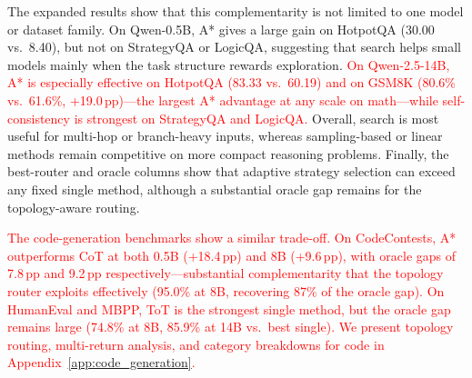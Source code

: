 \documentclass[10pt]{article}
\begin{document}
The expanded results show that this complementarity is not limited to one model or dataset family. On Qwen-0.5B, A* gives a large gain on HotpotQA (30.00 vs.\ 8.40), but not on StrategyQA or LogicQA, suggesting that search helps small models mainly when the task structure rewards exploration. \textcolor{red}{On Qwen-2.5-14B, A* is especially effective on HotpotQA (83.33 vs.\ 60.19) and on GSM8K (80.6\% vs.\ 61.6\%, +19.0\,pp)---the largest A* advantage at any scale on math---while self-consistency is strongest on StrategyQA and LogicQA.} Overall, search is most useful for multi-hop or branch-heavy inputs, whereas sampling-based or linear methods remain competitive on more compact reasoning problems. Finally, the best-router and oracle columns show that adaptive strategy selection can exceed any fixed single method, although a substantial oracle gap remains for the topology-aware routing.

\textcolor{red}{The code-generation benchmarks show a similar trade-off. On CodeContests, A* outperforms CoT at both 0.5B (+18.4\,pp) and 8B (+9.6\,pp), with oracle gaps of 7.8\,pp and 9.2\,pp respectively---substantial complementarity that the topology router exploits effectively (95.0\% at 8B, recovering 87\% of the oracle gap). On HumanEval and MBPP, ToT is the strongest single method, but the oracle gap remains large (74.8\% at 8B, 85.9\% at 14B vs.\ best single). We present topology routing, multi-return analysis, and category breakdowns for code in Appendix~\ref{app:code_generation}.}

\end{document}
